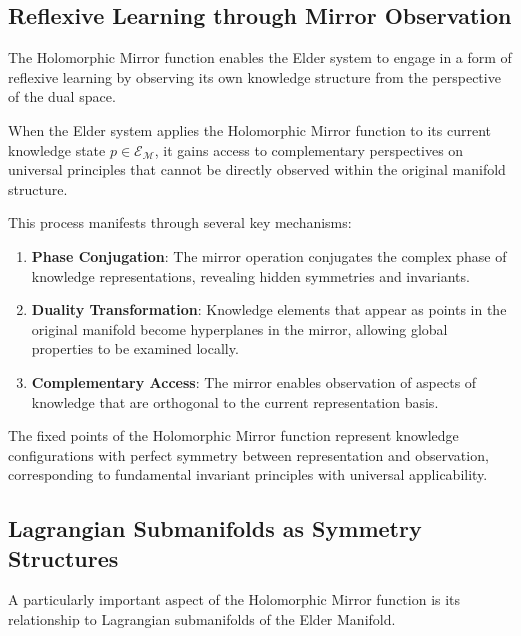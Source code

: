 \subsection{Reflexive Learning through Mirror Observation}

The Holomorphic Mirror function enables the Elder system to engage in a form of reflexive learning by observing its own knowledge structure from the perspective of the dual space.

\begin{theorem}
When the Elder system applies the Holomorphic Mirror function to its current knowledge state $p \in \mathcal{E}_{\mathcal{M}}$, it gains access to complementary perspectives on universal principles that cannot be directly observed within the original manifold structure.
\end{theorem}

This process manifests through several key mechanisms:

\begin{enumerate}
\item \textbf{Phase Conjugation}: The mirror operation conjugates the complex phase of knowledge representations, revealing hidden symmetries and invariants.
\item \textbf{Duality Transformation}: Knowledge elements that appear as points in the original manifold become hyperplanes in the mirror, allowing global properties to be examined locally.
\item \textbf{Complementary Access}: The mirror enables observation of aspects of knowledge that are orthogonal to the current representation basis.
\end{enumerate}

\begin{proposition}
The fixed points of the Holomorphic Mirror function represent knowledge configurations with perfect symmetry between representation and observation, corresponding to fundamental invariant principles with universal applicability.
\end{proposition}

\subsection{Lagrangian Submanifolds as Symmetry Structures}

A particularly important aspect of the Holomorphic Mirror function is its relationship to Lagrangian submanifolds of the Elder Manifold.

